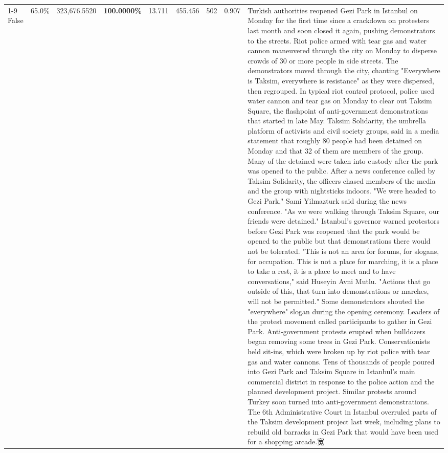 \begin{table}[H]
\begin{tabular}{lllrlllll}
\cline{1-9}
False & 65.0\% & 323,676.5520 & \bfseries \color{red} 100.0000\% & 13.711 & 455.456 & 502 & 0.907 & Turkish authorities reopened Gezi Park in Istanbul on Monday for the first time since a crackdown on protesters last month and soon closed it again, pushing demonstrators to the streets. Riot police armed with tear gas and water cannon maneuvered through the city on Monday to disperse crowds of 30 or more people in side streets. The demonstrators moved through the city, chanting "Everywhere is Taksim, everywhere is resistance" as they were dispersed, then regrouped. In typical riot control protocol, police used water cannon and tear gas on Monday to clear out Taksim Square, the flashpoint of anti-government demonstrations that started in late May. Taksim Solidarity, the umbrella platform of activists and civil society groups, said in a media statement that roughly 80 people had been detained on Monday and that 32 of them are members of the group. Many of the detained were taken into custody after the park was opened to the public. After a news conference called by Taksim Solidarity, the officers chased members of the media and the group with nightsticks indoors. "We were headed to Gezi Park," Sami Yilmazturk said during the news conference. "As we were walking through Taksim Square, our friends were detained." Istanbul's governor warned protestors before Gezi Park was reopened that the park would be opened to the public but that demonstrations there would not be tolerated. "This is not an area for forums, for slogans, for occupation. This is not a place for marching, it is a place to take a rest, it is a place to meet and to have conversations," said Huseyin Avni Mutlu. "Actions that go outside of this, that turn into demonstrations or marches, will not be permitted." Some demonstrators shouted the "everywhere" slogan during the opening ceremony. Leaders of the protest movement called participants to gather in Gezi Park. Anti-government protests erupted when bulldozers began removing some trees in Gezi Park. Conservationists held sit-ins, which were broken up by riot police with tear gas and water cannons. Tens of thousands of people poured into Gezi Park and Taksim Square in Istanbul's main commercial district in response to the police action and the planned development project. Similar protests around Turkey soon turned into anti-government demonstrations. The 6th Administrative Court in Istanbul overruled parts of the Taksim development project last week, including plans to rebuild old barracks in Gezi Park that would have been used for a shopping arcade.宽 \\

\end{tabular}
\end{table}
